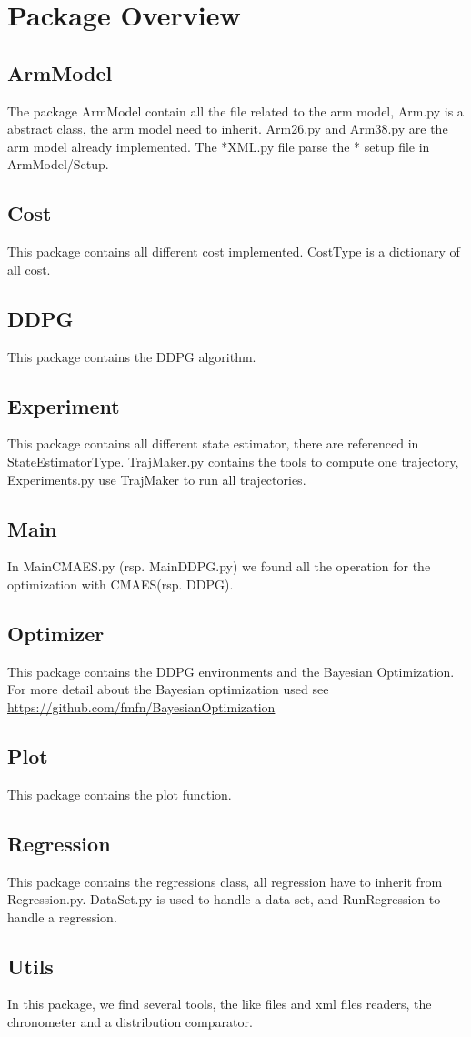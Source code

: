 \documentclass[a4paper]{article}
\begin{document}
\section{Package Overview}
\subsection{ArmModel}
The package ArmModel contain all the file related to the arm model, Arm.py is a abstract class, the arm model need to inherit. Arm26.py and Arm38.py are the arm model already implemented. The *XML.py file parse the * setup file in ArmModel/Setup.
\subsection{Cost}
This package contains all different cost implemented. CostType is a dictionary of all cost.
\subsection{DDPG}
This package contains the DDPG algorithm.
\subsection{Experiment}
This package contains all different state estimator, there are referenced in StateEstimatorType. TrajMaker.py contains the tools to compute one trajectory, Experiments.py use TrajMaker to run all trajectories.
\subsection{Main}
In MainCMAES.py (rsp. MainDDPG.py) we found all the operation for the optimization with CMAES(rsp. DDPG).
\subsection{Optimizer}
This package contains the DDPG environments and the Bayesian Optimization. For more detail about the Bayesian optimization used see 
\url{https://github.com/fmfn/BayesianOptimization} 

\subsection{Plot}
This package contains the plot function.
\subsection{Regression}
This package contains the regressions class, all regression have to inherit from Regression.py.
DataSet.py is used to handle a data set, and RunRegression to handle a regression.
\subsection{Utils}
In this package, we find several tools, the like files and xml files readers, the chronometer and a distribution comparator.
\end{document}
